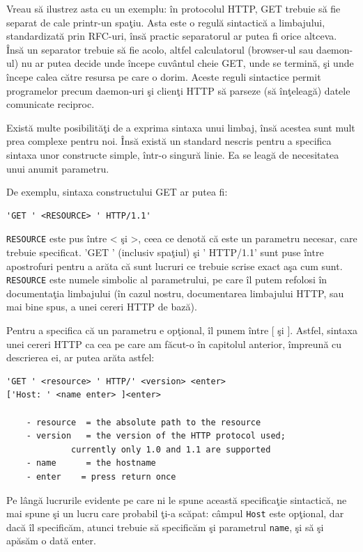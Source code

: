 Vreau să ilustrez asta cu un exemplu: în protocolul HTTP, GET trebuie
să fie separat de cale printr-un spaţiu. Asta este o regulă sintactică
a limbajului, standardizată prin
RFC-uri,
însă practic separatorul ar putea fi orice altceva.
Însă un separator trebuie să fie acolo, altfel calculatorul (browser-ul
sau daemon-ul) nu ar putea decide unde începe cuvântul cheie {\glqq}GET{\grqq}, unde
se termină, şi unde începe calea către resursa pe care o dorim.
Aceste reguli sintactice
permit programelor precum daemon-uri şi clienţi HTTP
să parseze (să {\glqq}înţeleagă{\grqq}) datele comunicate reciproc.

Există multe posibilităţi de a exprima sintaxa unui limbaj, însă acestea
sunt mult prea complexe pentru noi. Însă există un standard nescris
pentru a specifica sintaxa unor constructe simple, într-o singură linie.
Ea se leagă de necesitatea unui anumit parametru.

De exemplu, sintaxa constructului GET ar putea fi:\\
\begin{verbatim}'GET ' <RESOURCE> ' HTTP/1.1'\end{verbatim}
\texttt{RESOURCE} este pus între < şi >, ceea ce denotă că
este un parametru necesar, care trebuie specificat.
'GET ' (inclusiv spaţiul) şi ' HTTP/1.1' sunt puse
între apostrofuri pentru a arăta că sunt lucruri
ce trebuie scrise exact aşa cum sunt. \texttt{RESOURCE}
este numele simbolic al parametrului, pe care îl putem
refolosi în documentaţia limbajului (în cazul nostru,
documentarea limbajului HTTP, sau mai bine spus, a unei
cereri HTTP de bază).

Pentru a specifica că un parametru e opţional, îl punem între [ şi ].
Astfel, sintaxa unei cereri HTTP ca cea pe care am făcut-o în capitolul
anterior, împreună cu descrierea ei, ar putea arăta astfel:
\begin{verbatim}
'GET ' <resource> ' HTTP/' <version> <enter>
['Host: ' <name enter> ]<enter>

	- resource	= the absolute path to the resource
	- version 	= the version of the HTTP protocol used;
             currently only 1.0 and 1.1 are supported
	- name	    = the hostname
	- enter    = press return once
\end{verbatim}

Pe lângă lucrurile evidente pe care ni le spune această specificaţie
sintactică, ne mai spune şi un lucru care probabil ţi-a scăpat:
câmpul \texttt{Host} este opţional, dar dacă îl specificăm, atunci
trebuie să specificăm şi parametrul \texttt{name}, şi să şi apăsăm o dată enter.

